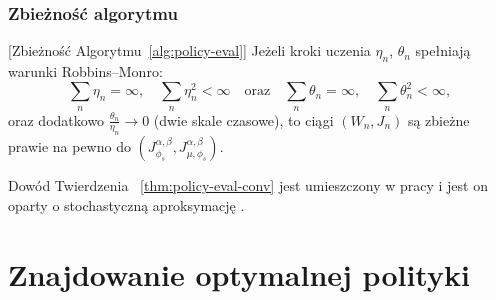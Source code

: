 \subsubsection{Zbieżność algorytmu}

\begin{theorem} \cite{eshwar2025}[Zbieżność Algorytmu~\ref{alg:policy-eval}]
\label{thm:policy-eval-conv}
Jeżeli kroki uczenia $\eta_n$, $\theta_n$ spełniają warunki Robbins--Monro:
\[
\sum_n \eta_n = \infty, \quad \sum_n \eta_n^2 < \infty \quad \text{oraz} \quad \sum_n \theta_n = \infty, \quad \sum_n \theta_n^2 < \infty,
\]
 oraz dodatkowo $\frac{\theta_n}{\eta_n} \to 0$ (dwie skale czasowe), to ciągi $(W_n, J_n)$ są zbieżne prawie na pewno do $(J^{\alpha, \beta}_{\phi_s}, J^{\alpha, \beta}_{\mu, \phi_s})$.
\end{theorem}

Dowód Twierdzenia ~\ref{thm:policy-eval-conv} jest umieszczony w pracy \cite{eshwar2025} i jest on oparty o stochastyczną aproksymację \cite{borkar2008}.





\section{Znajdowanie optymalnej polityki}


